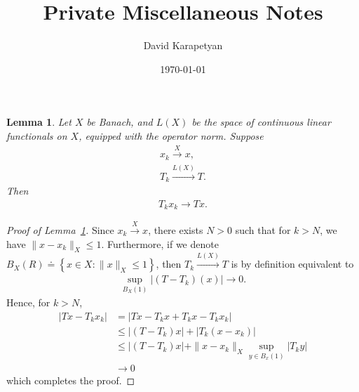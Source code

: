 \documentclass[12pt,reqno]{amsart}
\numberwithin{equation}{section}  %
\newtheorem{lemma}[theorem]{Lemma}
\begin{document}
\title{Private Miscellaneous Notes}
\author{David Karapetyan}
\address{Department of Mathematics  \\
    University  of Notre Dame\\
        Notre Dame, IN 46556 }
        \date{\today}
        \maketitle
        \section{}
        \label{sec:ll}
        
\begin{lemma}
Let $X$ be Banach, and $L(X)$ be the space of continuous linear functionals on
$X$, equipped with the operator norm. Suppose 
%
%
\begin{gather*}
  x_{k} \xrightarrow{X} x,
  \\
  T_{k} \xrightarrow{L(X)} T.
\end{gather*}
%
%
Then
\begin{gather*}
  T_{k} x_{k} \to Tx.
\end{gather*}
%
\label{lem:diag}
\end{lemma}
%
%
\begin{proof}[Proof of Lemma~\ref{lem:diag}]
  Since $x_{k} \xrightarrow{X} x$, there exists $N > 0$ such that for $k > N$,
  we have $\|x -x_{k} \|_{X} \le 1$. Furthermore, if we denote $B_{X}(R) \doteq
  \left\{ x \in X: \| x \|_{X} \le 1 \right\}$, then $T_{k}
  \xrightarrow{L(X)} T$ is by definition equivalent to 
  \begin{equation*}
  \begin{split}
    \sup_{B_{X}(1)}  | (T - T_{k})(x) | \to 0.
  \end{split}
  \end{equation*}
  Hence, for $k > N$, 
  \begin{equation*}
  \begin{split}
    | Tx - T_{k}x_{k} |
    & = | Tx - T_{k}x + T_{k}x - T_{k}x_{k} |
    \\
    & \le | (T - T_{k})x | + | T_{k}(x -x_{k}) |
    \\
    & \le | (T - T_{k})x |
    + \| x - x_{k}\|_{X} \sup_{y \in B_{x}(1)} | T_{k}y |
    \\
    & \to 0
  \end{split}
  \end{equation*}
  which completes the proof.
\end{proof}
\end{document}
